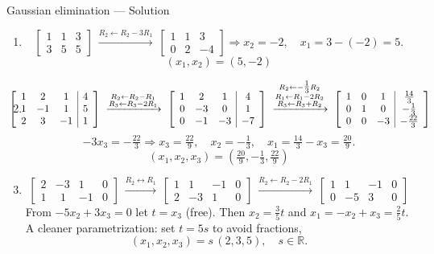 \documentclass[9pt]{beamer}
\begin{document}
\begin{frame}{Gaussian elimination — Solution}
\small
\begin{enumerate}[leftmargin=0.5cm, label=(\alph*), rightmargin=0.2cm]

\item
\[
\left[
\begin{array}{cc|c}
1&1&3\\
3&5&5
\end{array}\right]
\ \xrightarrow{R_2\leftarrow R_2-3R_1}\
\left[
\begin{array}{cc|c}
1&1&3\\
0&2&-4
\end{array}\right]
\Rightarrow x_2=-2,\quad x_1=3-(-2)=5.
\]
\[
\boxed{(x_1,x_2)=(5,-2)}
\]

\item
\[
\hspace{-0.6cm}
\left[
\begin{array}{ccc|c}
1&2&1&4\\
1&-1&1&5\\
2&3&-1&1
\end{array}\right]
\ \xrightarrow{\substack{R_2\leftarrow R_2-R_1\\ R_3\leftarrow R_3-2R_1}}\
\left[
\begin{array}{ccc|c}
1&2&1&4\\
0&-3&0&1\\
0&-1&-3&-7
\end{array}\right]
\ \xrightarrow{\substack{R_2\leftarrow -\tfrac{1}{3}R_2\\ 
R_1\leftarrow R_1-2R_2\\
R_3\leftarrow R_3+R_2
}}\
\left[
\begin{array}{ccc|c}
1&0&1&\tfrac{14}{3}\\
0&1&0&-\tfrac{1}{3}\\
0&0&-3&-\tfrac{22}{3}
\end{array}\right]
\]
\[
-3x_3=-\tfrac{22}{3}\Rightarrow x_3=\tfrac{22}{9},\quad
x_2=-\tfrac{1}{3},\quad
x_1=\tfrac{14}{3}-x_3=\tfrac{20}{9}.
\]
\[
\boxed{\left(x_1,x_2,x_3\right)=\left(\tfrac{20}{9},-\tfrac{1}{3},\tfrac{22}{9}\right)}
\]

\item
\[
\left[
\begin{array}{ccc|c}
2&-3&1&0\\
1&\ \ 1&-1&0
\end{array}\right]
\ \xrightarrow{R_2\leftrightarrow R_1}\
\left[
\begin{array}{ccc|c}
1&1&-1&0\\
2&-3&1&0
\end{array}\right]
\ \xrightarrow{R_2\leftarrow R_2-2R_1}\
\left[
\begin{array}{ccc|c}
1&1&-1&0\\
0&-5&3&0
\end{array}\right]
\]
From $-5x_2+3x_3=0$ let $t=x_3$ (free). Then $x_2=\tfrac{3}{5}t$ and $x_1=-x_2+x_3=\tfrac{2}{5}t$.
A cleaner parametrization: set $t=5s$ to avoid fractions,
\[
\boxed{(x_1,x_2,x_3)=s\,(2,3,5),\quad s\in\mathbb{R}.}
\]

\end{enumerate}
\end{frame}
\end{document}
